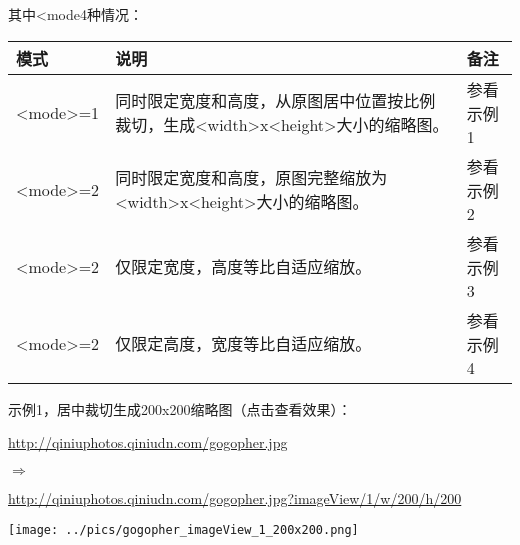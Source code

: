 \documentclass[11pt, oneside]{book}
\newcommand{\qpar}[1]{
\vspace{0.25em}
\noindent
#1\par
\vspace{0.25em}
}
\newcommand{\qurl}[1]{\url{#1}}
\newcommand{\qtable}[1]{\vspace{0.5em}#1\vspace{0.5em}}
\begin{document}
\begin{CJK*}{UTF8}{song}
\qpar{其中\textless mode4种情况：}
\qtable{
\def\arraystretch{1.5}
\begin{tabular}{|l|p{22em}|l|}
\hline
模式 & 说明 & 备注 \\
\hline
\textless mode\textgreater=1 & 同时限定宽度和高度，从原图居中位置按比例裁切，生成\textless width\textgreater x\textless height\textgreater 大小的缩略图。& 参看示例1 \\
\hline
\textless mode\textgreater=2 & 同时限定宽度和高度，原图完整缩放为\textless width\textgreater x\textless height\textgreater 大小的缩略图。& 参看示例2 \\
\hline
\textless mode\textgreater=2 & 仅限定宽度，高度等比自适应缩放。 & 参看示例3 \\
\hline
\textless mode\textgreater=2 & 仅限定高度，宽度等比自适应缩放。 & 参看示例4 \\
\hline
\end{tabular}
}

\clearpage

\qpar{示例1，居中裁切生成200x200缩略图（点击查看效果）：}
\qpar{\qurl{http://qiniuphotos.qiniudn.com/gogopher.jpg}}
\qpar{$\Rightarrow$}
\qpar{\qurl{http://qiniuphotos.qiniudn.com/gogopher.jpg?imageView/1/w/200/h/200}}

\begin{center}
\texttt{[image: ../pics/gogopher\_imageView\_1\_200x200.png]}
\end{center}


\end{CJK*}
\end{document}
